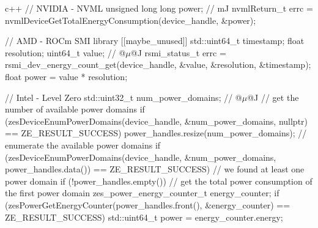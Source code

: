 \begin{listing}
    \begin{moderncode}[fontsize=\small]{c++}
// NVIDIA - NVML
unsigned long long power{};  // mJ
nvmlReturn_t errc = nvmlDeviceGetTotalEnergyConsumption(device_handle, &power);

// AMD - ROCm SMI library
[[maybe_unused]] std::uint64_t timestamp{};
float resolution{};
uint64_t value{};  // @$\mu$@J
rsmi_status_t errc = rsmi_dev_energy_count_get(device_handle, &value, &resolution, &timestamp);
float power = value * resolution;

// Intel - Level Zero
std::uint32_t num_power_domains{};  // @$\mu$@J
// get the number of available power domains
if (zesDeviceEnumPowerDomains(device_handle, &num_power_domains, nullptr) == ZE_RESULT_SUCCESS) {
    power_handles.resize(num_power_domains);
    // enumerate the available power domains
    if (zesDeviceEnumPowerDomains(device_handle, &num_power_domains, power_handles.data()) == ZE_RESULT_SUCCESS) {
        // we found at least one power domain
        if (!power_handles.empty()) {
            // get the total power consumption of the first power domain
            zes_power_energy_counter_t energy_counter{};
            if (zesPowerGetEnergyCounter(power_handles.front(), &energy_counter) == ZE_RESULT_SUCCESS) {
                std::uint64_t power = energy_counter.energy;
            }
        }
    }
}
    \end{moderncode}
    \caption{%
    Example library function calls to gather the total power consumption since the last driver reload from an NVIDIA \gls{gpu} using \gls{nvml}, an \gls{amd} \gls{gpu} using \gls{rocmsmi}, and Intel \gls{gpu} using Level Zero.
    Note that the respective environments must be initialized beforehand and that the  points to a supported and available device.
    }
    \label{code:vendor_library_calls}
\end{listing}

